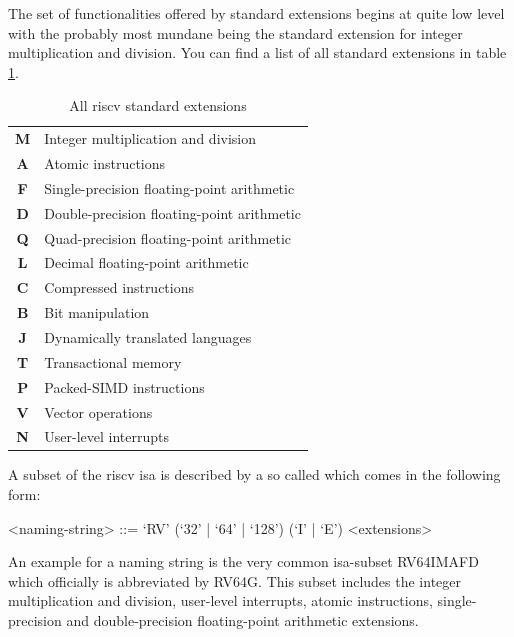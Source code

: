 The set of functionalities offered by standard extensions begins at quite low level with the probably most mundane being the standard extension for integer multiplication and division.
You can find a list of all standard extensions in table \ref{tbl:rv-exts}.

\begin{table}
    \centering
    \begin{tabular}{| c | l |}
        \hline
        \textbf{M} & Integer multiplication and division \\
        \textbf{A} & Atomic instructions \\
        \textbf{F} & Single-precision floating-point arithmetic \\
        \textbf{D} & Double-precision floating-point arithmetic \\
        \textbf{Q} & Quad-precision floating-point arithmetic \\
        \textbf{L} & Decimal floating-point arithmetic \\
        \textbf{C} & Compressed instructions \\
        \textbf{B} & Bit manipulation \\
        \textbf{J} & Dynamically translated languages \\
        \textbf{T} & Transactional memory \\
        \textbf{P} & Packed-SIMD instructions \\
        \textbf{V} & Vector operations \\
        \textbf{N} & User-level interrupts \\
        \hline
    \end{tabular}
    \caption{All \gls{riscv} standard extensions}
    \label{tbl:rv-exts}
\end{table}

A subset of the \gls{riscv} \gls{isa} is described by a so called  which comes in the following form:

\begin{grammar}
    <naming-string> ::= `RV' (`32' | `64' | `128') (`I' | `E') <extensions>
\end{grammar}

An example for a naming string is the very common \gls{isa}-subset RV64IMAFD which officially is abbreviated by RV64G.
This subset includes the integer multiplication and division, user-level interrupts, atomic instructions, single-precision and double-precision floating-point arithmetic extensions.

